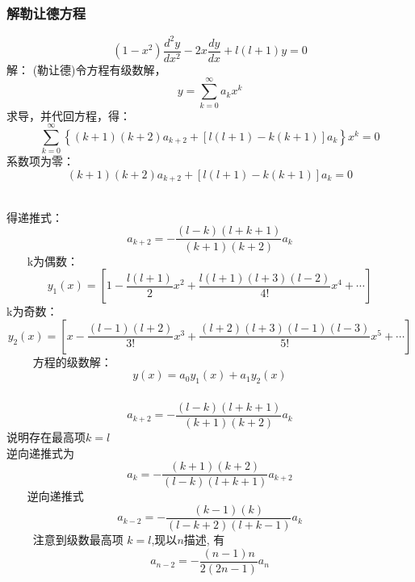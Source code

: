 \begin{frame}
	\frametitle{解勒让德方程}
	\begin{equation*}
		\boxed{\left(1-x^{2}\right) \frac{d^{2} y}{d x^{2}}-2 x \frac{d y}{d x}+l(l+1)y=0}
	\end{equation*}		
	\alert{解：} (勒让德)令方程有级数解，
	\[ y=\sum_{k=0}^{\infty} a_k x ^k \]
	求导，并代回方程，得：
	\begin{equation*}
		\sum_{k=0}^{\infty}\left\{(k+1)(k+2) a_{k+2}+[l(l+1)-k(k+1)] a_{k}\right\} x^{k}=0
	\end{equation*}	
	系数项为零：
	\begin{equation*}
		(k+1)(k+2) a_{k+2}+[l(l+1)-k(k+1)] a_{k}=0
	\end{equation*}	   
\end{frame}	

\begin{frame}
	得递推式：
	\begin{equation*}
		a_{k+2}=-\frac{(l-k)(l+k+1)}{(k+1)(k+2) }a_{k}
	\end{equation*}	   
	k为偶数：
	\begin{equation*}
		y_{1}(x)=\left[1-\frac{l(l+1)}{2} x^{2}+\frac{l(l+1)(l+3)(l-2)}{4 !} x^{4}+\cdots\right]
	\end{equation*}	
	k为奇数：
	\begin{equation*}
		y_{2}(x)=\left[x-\frac{(l-1)(l+2)}{3 !} x^{3}+\frac{(l+2)(l+3)(l-1)(l-3)}{5 !} x^{5}+\cdots\right]
	\end{equation*}	    
	方程的级数解：\[ y(x)=  a_{0}y_{1}(x) + a_{1} y_{2}(x)  \]	
\end{frame}	

\begin{frame}
	\frametitle{}
	\begin{equation*}
		a_{k+2}=-\frac{(l-k)(l+k+1)}{(k+1)(k+2) }a_{k}
	\end{equation*}
	说明存在最高项$k=l$ \\
	逆向递推式为 
	\begin{equation*}
		a_{k}=-\frac{(k+1)(k+2) }{(l-k)(l+k+1)}a_{k+2}
	\end{equation*}	   
	{\Bullet}逆向递推式
	\begin{equation*}
		a_{k-2}=-\frac{(k-1)(k) }{(l-k+2)(l+k-1)}a_{k}
	\end{equation*}	    
	注意到级数最高项 $k=l$,现以$n$描述, 有 
	\begin{equation*}
		a_{n-2}=-\frac{(n-1) n}{2(2n-1)} a_{n}
	\end{equation*}	 
\end{frame}	

